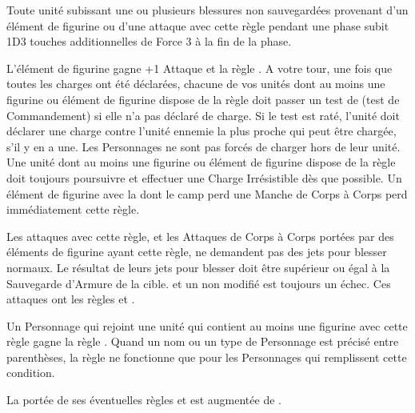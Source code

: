 
Toute unité subissant une ou plusieurs blessures non sauvegardées provenant d'un élément de figurine ou d'une attaque avec cette règle pendant une phase subit 1D3 touches additionnelles de Force 3 à la fin de la phase.


L'élément de figurine gagne +1 Attaque et la règle \immunetopsychology{}. A votre tour, une fois que toutes les charges ont été déclarées, chacune de vos unités dont au moins une figurine ou élément de figurine dispose de la règle \frenzy{} doit passer un test de \frenzy{} (test de Commandement) si elle n'a pas déclaré de charge. Si le test est raté, l'unité doit déclarer une charge contre l'unité ennemie la plus proche qui peut être chargée, s'il y en a une. Les Personnages ne sont pas forcés de charger hors de leur unité. Une unité dont au moins une figurine ou élément de figurine dispose de la règle \frenzy{} doit toujours poursuivre et effectuer une Charge Irrésistible dès que possible. Un élément de figurine avec la \frenzy{} dont le camp perd une Manche de Corps à Corps perd immédiatement cette règle.


Les attaques avec cette règle, et les Attaques de Corps à Corps portées par des éléments de figurine ayant cette règle, ne demandent pas des jets pour blesser normaux. Le résultat de leurs jets pour blesser doit être supérieur ou égal à la Sauvegarde d'Armure de la cible.  et un  non modifié est toujours un échec. Ces attaques ont les règles \flamingattacks{} et .


Un Personnage qui rejoint une unité qui contient au moins une figurine avec cette règle gagne la règle \stubborn{}. Quand un nom ou un type de Personnage est précisé entre parenthèses, la règle ne fonctionne que pour les Personnages qui remplissent cette condition.


 La portée de ses éventuelles règles \inspiringpresence{} et \holdyourground{} est augmentée de .

